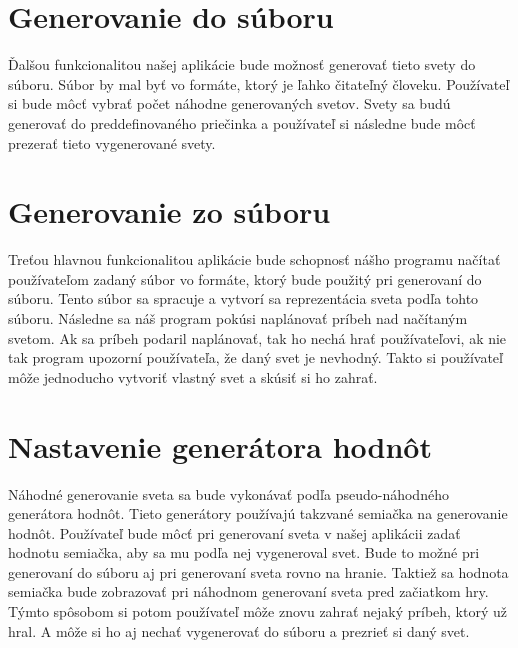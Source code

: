 \section{Generovanie do súboru}
Ďalšou funkcionalitou našej aplikácie bude možnosť generovať tieto svety do súboru. Súbor by mal byť vo formáte, ktorý je ľahko čitateľný človeku. Používateľ si bude môcť vybrať počet náhodne generovaných svetov. Svety sa budú generovať do preddefinovaného priečinka a používateľ si následne bude môcť prezerať tieto vygenerované svety.\par
\section{Generovanie zo súboru}
Treťou hlavnou funkcionalitou aplikácie bude schopnosť nášho programu načítať používateľom zadaný súbor vo formáte, ktorý bude použitý pri generovaní do súboru. Tento súbor sa spracuje a vytvorí sa reprezentácia sveta podľa tohto súboru. Následne sa náš program pokúsi naplánovať príbeh nad načítaným svetom. Ak sa príbeh podaril naplánovať, tak ho nechá hrať používateľovi, ak nie tak program upozorní používateľa, že daný svet je nevhodný. Takto si používateľ môže jednoducho vytvoriť vlastný svet a skúsiť si ho zahrať.\par
\section{Nastavenie generátora hodnôt}
Náhodné generovanie sveta sa bude vykonávať podľa pseudo-náhodného generátora hodnôt. Tieto generátory používajú takzvané semiačka na generovanie hodnôt. Používateľ bude môcť pri generovaní sveta v našej aplikácii zadať hodnotu semiačka, aby sa mu podľa nej vygeneroval svet. Bude to možné pri generovaní do súboru aj pri generovaní sveta rovno na hranie. Taktiež sa hodnota semiačka bude zobrazovať pri náhodnom generovaní sveta pred začiatkom hry. Týmto spôsobom si potom používateľ môže znovu zahrať nejaký príbeh, ktorý už hral. A môže si ho aj nechať vygenerovať do súboru a prezrieť si daný svet.